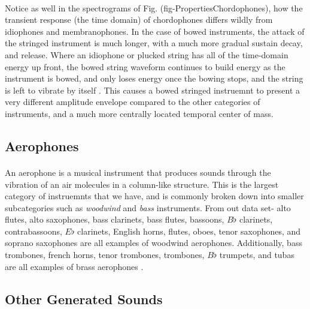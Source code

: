 \documentclass[12pt,letterpaper]{article}
\begin{document}
\paragraph*{}Notice as well in the spectrograms of Fig. ({fig-PropertiesChordophones}), how the transient response (the time domain) of chordophones differs wildly from idiophones and membranophones. In the case of bowed instruments, the attack of the stringed instrument is much longer, with a much more gradual sustain decay, and release. Where an idiophone or plucked string has all of the time-domain energy up front, the bowed string waveform continues to build energy as the instrument is bowed, and only loses energy once the bowing stops, and the string is left to vibrate by itself \cite{Hunter}. This causes a bowed stringed instruemnt to present a very different amplitude envelope compared to the other categories of instruments, and a much more centrally located temporal center of mass.


\subsection{Aerophones}
\label{subsec-Aerophones}

\paragraph*{}An aerophone is a musical instrument that produces sounds through the vibration of an air molecules in a column-like structure. This is the largest category of instruemnts that we have, and is commonly broken down into smaller subcategories such as \textit{woodwind} and \textit{bass} instruments. From out data set- alto flutes, alto saxophones, bass clarinets, bass flutes, bassoons, $B\flat$ clarinets, contrabassoons, $E\flat$ clarinets, English horns, flutes, oboes, tenor saxophones, and soprano saxophones are all examples of woodwind aerophones. Additionally, bass trombones, french horns, tenor trombones, trombones, $B\flat$ trumpets, and tubas are all examples of brass aerophones \cite{Hornbostel,Olson,White}.


\subsection{Other Generated Sounds}
\label{subsec-Generated}
\end{document}

